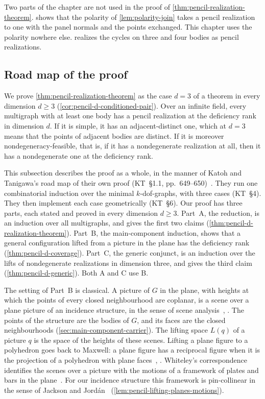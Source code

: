 Two parts of the chapter are not used in the proof of
\cref{thm:pencil-realization-theorem}.  shows that the
polarity of \cref{lem:polarity-join} takes a pencil
realization to one with the panel normals and the points exchanged.
This chapter uses the polarity nowhere else. 
realizes the cycles on three and four bodies as pencil realizations.

\subsection{Road map of the proof}
\label{sec:pencil-roadmap}

We prove \cref{thm:pencil-realization-theorem} as the case $d = 3$ of a
theorem in every dimension $d \ge 3$
(\cref{cor:pencil-d-conditioned-pair}). Over an infinite field, every
multigraph with at least one body has a pencil realization at the
deficiency rank in dimension $d$. If it is simple, it has an
adjacent-distinct one, which at $d = 3$ means that the points of
adjacent bodies are distinct. If it is moreover nondegeneracy-feasible,
that is, if it has a nondegenerate realization at all, then it has a
nondegenerate one at the deficiency rank.

This subsection describes the proof as a whole, in the manner of Katoh
and Tanigawa's road map of their own proof (KT~\S1.1,
pp.~649--650)~\cite{katohTanigawa2011}. They run one combinatorial
induction over the minimal $k$-dof-graphs, with three cases (KT~\S4).
They then implement each case geometrically (KT~\S6). Our proof has
three parts, each stated and proved in every dimension $d \ge 3$.
Part~A, the reduction, is an induction over all multigraphs, and gives
the first two claims (\cref{thm:pencil-d-realization-theorem}). Part~B,
the main-component induction, shows that a general configuration lifted
from a picture in the plane has the deficiency rank
(\cref{thm:pencil-d-coverage}). Part~C, the generic conjunct, is an
induction over the lifts of nondegenerate realizations in dimension
three, and gives the third claim (\cref{thm:pencil-d-generic}). Both A
and C use B.

The setting of Part~B is classical. A picture of $G$ in the plane, with
heights at which the points of every closed neighbourhood are coplanar,
is a scene over a plane picture of an incidence structure, in the sense
of scene analysis~\cite[\S\S 2.1--2.2]{whiteley1984},
\cite[\S 2.2]{sugihara1984}. The points of the structure are the bodies
of $G$, and its faces are the closed neighbourhoods
(\cref{sec:main-component-carrier}). The lifting space $L(q)$ of a
picture $q$ is the space of the heights of these scenes. Lifting a plane
figure to a polyhedron goes back to Maxwell: a plane figure has a
reciprocal figure when it is the projection of a polyhedron with plane
faces~\cite[p.~258]{maxwell1864reciprocal},
\cite[pp.~7--8]{maxwell1870}. Whiteley's correspondence identifies the
scenes over a picture with the motions of a framework of plates and bars
in the plane~\cite[Proposition~4.1]{whiteley1984}. For our incidence
structure this framework is pin-collinear in the sense of Jackson and
Jord\'an~\cite[p.~9]{jacksonJordan2006pin}
(\cref{lem:pencil-lifting-planes-motions}).

